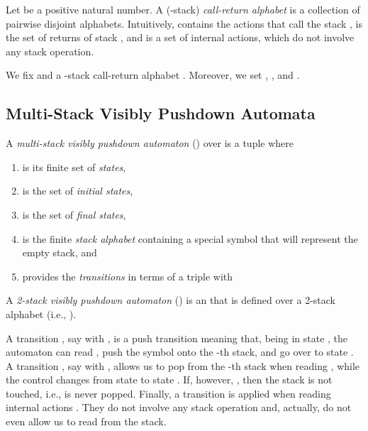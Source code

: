 \documentclass{LMCS}
\begin{document}
Let  be a positive natural number. A (-stack)
\emph{call-return alphabet} is a collection
 of pairwise disjoint alphabets.
Intuitively,  contains the actions that call the stack
,  is the set of returns of stack , and
 is a set of internal actions, which do not involve any stack
operation.

We fix  and a -stack call-return alphabet
. Moreover, we set , , and .

\subsection{Multi-Stack Visibly Pushdown Automata}

\begin{defi}
  A \emph{multi-stack visibly pushdown automaton} (\MVPA) over  is a
  tuple  where
\begin{enumerate}[]
\item  is its finite set of \emph{states},
\item  is the set of \emph{initial states},
\item  is the set of \emph{final states},
\item  is the finite \emph{stack alphabet} containing a special symbol
   that will represent the empty stack, and
\item  provides the \emph{transitions} in terms of a triple 
  with

\end{enumerate}

A \emph{2-stack visibly pushdown automaton} () is an \MVPA that is
defined over a 2-stack alphabet (i.e., ).
\end{defi}

A transition , say with , is a
push transition meaning that, being in state , the automaton can read ,
push the symbol  onto the -th stack,
and go over to state . A transition , say with , allows us to pop  from the -th stack
when reading , while the control changes from state  to state . If,
however, , then the stack is not touched, i.e.,  is never
popped. Finally, a transition  is applied when reading
internal actions . They do not involve any stack operation
and, actually, do not even allow us to read from the stack.
\end{document}
